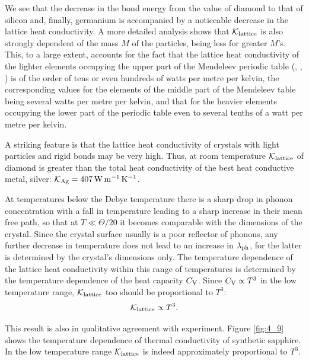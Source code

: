 We see that the decrease in the bond energy from the value of diamond to that of silicon and, finally, germanium is accompanied by a noticeable decrease in the lattice heat conductivity. A more detailed analysis shows that $\mathcal{K}_{\text{lattice}}$ is also strongly dependent of
the mass $M$ of the particles, being less for greater $M$'s. This, to a large extent, accounts for the fact that the lattice heat conductivity of the lighter elements occupying the upper part of the Mendeleev periodic table (, , ) is of the order of tens or even hundreds of watts per metre per kelvin, the corresponding values for the elements of the middle part of the Mendeleev table being several watts per metre per kelvin, and that for the heavier elements occupying the lower part of the periodic table even to several tenths of a watt per metre per kelvin.

A striking feature is that the lattice heat conductivity of crystals with light particles and rigid bonds may be very high. Thus, at room temperature $\mathcal{K}_{\text{lattice}}$ of diamond is greater than the total heat conductivity of the best heat conductive metal, silver: $\mathcal{K}_{\text{Ag}}=\SI{407}{\watt\per\metre\per\kelvin}$.

At temperatures below the Debye temperature there is a sharp drop in phonon concentration with a fall in temperature leading to a sharp increase in their mean free path, so that at $T\ll\Theta/20$ it becomes comparable with the dimensions of the crystal. Since the crystal surface usually is a poor reflector of phonons, any further decrease in temperature does not lead to an increase in $\lambda_{\text{ph}}$, for the latter is determined by the crystal's dimensions only. The temperature dependence of the lattice heat conductivity within this range of temperatures is determined by the temperature dependence of the heat capacity $C_{\text{V}}$. Since $C_{\text{V}}\propto T^3$ in the low temperature range,
$\mathcal{K}_{\text{lattice}}$ too should be proportional to $T^3$:
\begin{equation}\label{eq:4_56}
    \mathcal{K}_{\text{lattice}} \propto T^3.
\end{equation}

\noindent
This result is also in qualitative agreement with experiment. Figure \ref{fig:4_9} shows the temperature dependence of thermal conductivity of synthetic sapphire. In the low temperature range $\mathcal{K}_{\text{lattice}}$ is
indeed approximately proportional to $T^3$.

